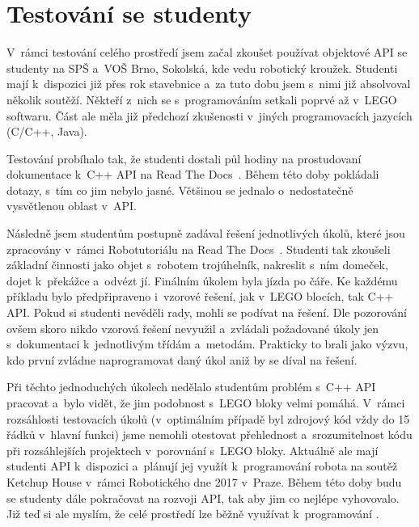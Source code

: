 \section{Testování se studenty}

V~rámci testování celého prostředí jsem začal zkoušet používat objektové API se studenty na SPŠ a~VOŠ Brno, Sokolská, kde vedu robotický kroužek.
Studenti mají k~dispozici již přes rok stavebnice \legoEV{} a~za tuto dobu jsem s~nimi již absolvoval několik soutěží. 
Někteří z~nich se s~programováním setkali poprvé až v~LEGO softwaru.
Část ale měla již předchozí zkušenosti v~jiných programovacích jazycích (C/C++, Java).

Testování probíhalo tak, že studenti dostali půl hodiny na prostudovaní dokumentace k~C++ API na Read The Docs~\cite{readthedocs}. 
Během této doby pokládali dotazy, s~tím co jim nebylo jasné. 
Většinou se jednalo o~nedostatečně vysvětlenou oblast v~API. 

Následně jsem studentům postupně zadával řešení jednotlivých úkolů, které jsou zpracovány v~rámci Robotutoriálu  na Read The Docs~\cite{readthedocs}.
Studenti tak zkoušeli základní činnosti jako objet s~robotem trojúhelník, nakreslit s~ním domeček, dojet k~překážce  a~odvézt jí. 
Finálním úkolem byla jízda po čáře.
Ke každému příkladu bylo předpřipraveno i~vzorové řešení, jak v~LEGO blocích, tak C++ API.
Pokud si studenti nevěděli rady, mohli se podívat na řešení. 
Dle pozorování ovšem skoro nikdo vzorová řešení nevyužil a~zvládali požadované úkoly jen s~dokumentaci k~jednotlivým třídám a~metodám.
Prakticky to brali jako výzvu, kdo první zvládne naprogramovat daný úkol aniž by se díval na řešení.

Při těchto jednoduchých úkolech nedělalo studentům problém s~C++ API pracovat a~bylo vidět, že jim podobnost s~LEGO bloky velmi pomáhá.
V~rámci rozsáhlosti testovacích úkolů (v~optimálním případě byl zdrojový kód vždy do 15 řádků v~hlavní funkci) jsme nemohli otestovat přehlednost a~srozumitelnost kódu při rozsáhlejších projektech v~porovnání s~LEGO bloky.
Aktuálně ale mají studenti API k~dispozici a~plánují jej využít k~programování robota na soutěž Ketchup House v~rámci Robotického dne 2017 v~Praze.
Během této doby budu se studenty dále pokračovat na rozvoji API, tak aby jim co nejlépe vyhovovalo.
Již teď si ale myslím, že celé prostředí lze běžně využívat k~programování \legoEV{}.
